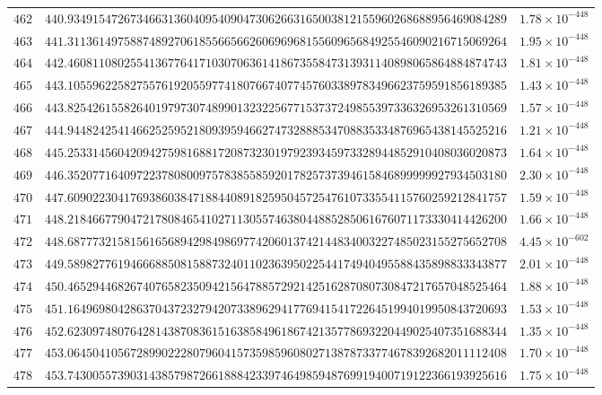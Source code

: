 \documentclass[12pt,reqno]{amsart}
\theoremstyle{remark}
\begin{document}
\begin{longtable}{clc}
$462$ & $440.9349154726734663136040954090473062663165003812155960268688956469084289$ & $1.78\times 10^{-448}$ \\
$463$ & $441.3113614975887489270618556656626069696815560965684925546090216715069264$ & $1.95\times 10^{-448}$ \\
$464$ & $442.4608110802554136776417103070636141867355847313931140898065864884874743$ & $1.81\times 10^{-448}$ \\
$465$ & $443.1055962258275576192055977418076674077457603389783496623759591856189385$ & $1.43\times 10^{-448}$ \\
$466$ & $443.8254261558264019797307489901323225677153737249855397336326953261310569$ & $1.57\times 10^{-448}$ \\
$467$ & $444.9448242541466252595218093959466274732888534708835334876965438145525216$ & $1.21\times 10^{-448}$ \\
$468$ & $445.2533145604209427598168817208732301979239345973328944852910408036020873$ & $1.64\times 10^{-448}$ \\
$469$ & $446.3520771640972237808009757838558592017825737394615846899999927934503180$ & $2.30\times 10^{-448}$ \\
$470$ & $447.6090223041769386038471884408918259504572547610733554115760259212841757$ & $1.59\times 10^{-448}$ \\
$471$ & $448.2184667790472178084654102711305574638044885285061676071173330414426200$ & $1.66\times 10^{-448}$ \\
$472$ & $448.6877732158156165689429849869774206013742144834003227485023155275652708$ & $4.45\times 10^{-602}$ \\
$473$ & $449.5898277619466688508158873240110236395022544174940495588435898833343877$ & $2.01\times 10^{-448}$ \\
$474$ & $450.4652944682674076582350942156478857292142516287080730847217657048525464$ & $1.88\times 10^{-448}$ \\
$475$ & $451.1649698042863704372327942073389629417769415417226451994019950843720693$ & $1.53\times 10^{-448}$ \\
$476$ & $452.6230974807642814387083615163858496186742135778693220449025407351688344$ & $1.35\times 10^{-448}$ \\
$477$ & $453.0645041056728990222807960415735985960802713878733774678392682011112408$ & $1.70\times 10^{-448}$ \\
$478$ & $453.7430055739031438579872661888423397464985948769919400719122366193925616$ & $1.75\times 10^{-448}$ \\

\end{longtable}
\end{document}

